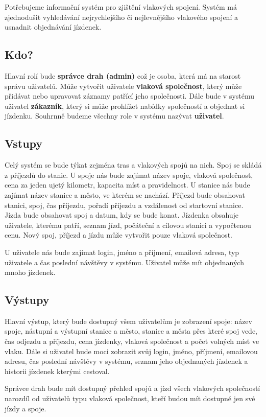 \documentclass[11pt]{article}
\begin{document}
Potřebujeme informační systém pro zjištění vlakových spojení. Systém má zjednodušit vyhledávání nejrychlejšího či nejlevnějšího vlakového spojení a usnadnit objednávání jízdenek.

\subsection{Kdo?}
Hlavní rolí bude \textbf{správce drah (admin)} což je osoba, která má na starost správu uživatelů. Může vytvořit uživatele \textbf{vlaková společnost}, který může přidávat nebo upravovat záznamy patřící jeho společnosti. Dále bude v systému uživatel \textbf{zákazník}, který si může prohlížet nabídky společností a objednat si jízdenku. Souhrnně budeme všechny role v systému nazývat \textbf{uživatel}.

\subsection{Vstupy}
Celý systém se bude týkat zejména tras a vlakových spojů na nich. Spoj se skládá z příjezdů do stanic. U spoje nás bude zajímat název spoje, vlaková společnost, cena za jeden ujetý kilometr, kapacita míst a pravidelnost. U stanice nás bude zajímat název stanice a město, ve kterém se nachází. Příjezd bude obsahovat stanici, spoj, čas příjezdu, pořadí příjezdu a vzdálenost od startovní stanice. Jízda bude obsahovat spoj a datum, kdy se bude konat. Jízdenka obsahuje uživatele, kterému patří, seznam jízd, počáteční a cílovou stanici a vypočtenou cenu. Nový spoj, příjezd a jízdu může vytvořit pouze vlaková společnost.

U uživatele nás bude zajímat login, jméno a příjmení, emailová adresa, typ uživatele a čas poslední návštěvy v systému. Uživatel může mít objednaných mnoho jízdenek.

\subsection{Výstupy}
Hlavní výstup, který bude dostupný všem uživatelům je zobrazení spoje: název spoje, nástupní a výstupní stanice a město, stanice a města přes které spoj vede, čas odjezdu a příjezdu, cena jízdenky, vlaková společnost a počet volných míst ve vlaku. Dále si uživatel bude moci zobrazit svůj login, jméno, příjmení, emailovou adresu, čas poslední návštěvy v systému, seznam jeho objednaných jízdenek a historii jízdenek kterými cestoval.

Správce drah bude mít dostupný přehled spojů a jízd všech vlakových společností narozdíl od uživatelů typu vlaková společnost, kteří budou mít dostupné jen své jízdy a spoje.
\end{document}

